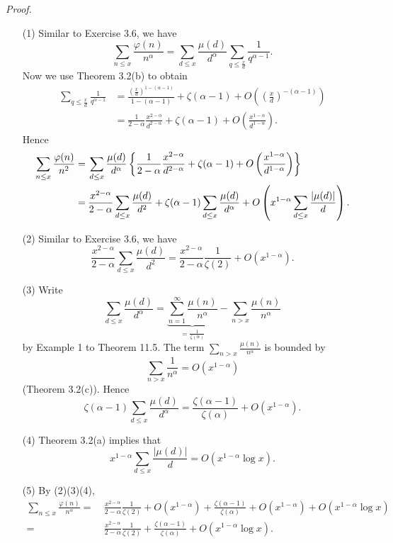 \documentclass{article}
\begin{document}
\emph{Proof.}
\begin{enumerate}
\item[(1)]
  Similar to Exercise 3.6, we have
  \[
    \sum_{n \leq x} \frac{\varphi(n)}{n^\alpha}
    = \sum_{d \leq x} \frac{\mu(d)}{d^\alpha} \sum_{q \leq \frac{x}{d}} \frac{1}{q^{\alpha-1}}.
  \]
  Now we use Theorem 3.2(b) to obtain
  \begin{align*}
    \sum_{q \leq \frac{x}{d}} \frac{1}{q^{\alpha-1}}
    &= \frac{\left( \frac{x}{d} \right)^{1 - (\alpha-1)}}{1 - (\alpha-1)}
        + \zeta(\alpha-1)
        + O\left( \left(\frac{x}{d}\right)^{-(\alpha-1)} \right) \\
    &= \frac{1}{2 - \alpha} \frac{x^{2 - \alpha}}{d^{2 - \alpha}}
        + \zeta(\alpha-1)
        + O\left( \frac{x^{1-\alpha}}{d^{1-\alpha}} \right).
  \end{align*}
  Hence
  \begin{align*}
    \sum_{n \leq x} \frac{\varphi(n)}{n^2}
    =& \: \sum_{d \leq x}
        \frac{\mu(d)}{d^\alpha} \left\{
            \frac{1}{2 - \alpha} \frac{x^{2 - \alpha}}{d^{2 - \alpha}}
            + \zeta(\alpha-1)
            + O\left( \frac{x^{1-\alpha}}{d^{1-\alpha}} \right)
        \right\} \\
    =& \: \frac{x^{2-\alpha}}{2-\alpha} \sum_{d \leq x} \frac{\mu(d)}{d^2}
        + \zeta(\alpha-1) \sum_{d \leq x} \frac{\mu(d)}{d^\alpha}
        + O\left( x^{1-\alpha}
            \sum_{d \leq x} \frac{\abs{\mu(d)}}{d} \right).
  \end{align*}

\item[(2)]
  Similar to Exercise 3.6, we have
  \[
    \frac{x^{2-\alpha}}{2-\alpha} \sum_{d \leq x} \frac{\mu(d)}{d^2}
    = \frac{x^{2-\alpha}}{2-\alpha} \frac{1}{\zeta(2)} + O(x^{1-\alpha}).
  \]

\item[(3)]
  Write
  \[
    \sum_{d \leq x} \frac{\mu(d)}{d^\alpha}
    = \underbrace{\sum_{n=1}^{\infty} \frac{\mu(n)}{n^\alpha}}_{= \frac{1}{\zeta(\alpha)}}
        - \sum_{n > x} \frac{\mu(n)}{n^\alpha}
  \]
  by Example 1 to Theorem 11.5.
  The term $\sum_{n > x} \frac{\mu(n)}{n^\alpha}$
  is bounded by
  \[
    \sum_{n > x} \frac{1}{n^\alpha} = O(x^{1-\alpha})
  \]
  (Theorem 3.2(c)).
  Hence
  \[
    \zeta(\alpha-1) \sum_{d \leq x} \frac{\mu(d)}{d^\alpha}
    = \frac{\zeta(\alpha-1)}{\zeta(\alpha)} + O(x^{1-\alpha}).
  \]

\item[(4)]
  Theorem 3.2(a) implies that
  \[
    x^{1-\alpha} \sum_{d \leq x} \frac{|\mu(d)|}{d} = O(x^{1-\alpha} \log x).
  \]

\item[(5)]
  By (2)(3)(4),
  \begin{align*}
    \sum_{n \leq x} \frac{\varphi(n)}{n^\alpha}
    =& \: \frac{x^{2-\alpha}}{2-\alpha} \frac{1}{\zeta(2)} + O(x^{1-\alpha})
        + \frac{\zeta(\alpha-1)}{\zeta(\alpha)} + O(x^{1-\alpha})
        + O(x^{1-\alpha} \log x) \\
    =& \: \frac{x^{2-\alpha}}{2-\alpha} \frac{1}{\zeta(2)}
        + \frac{\zeta(\alpha-1)}{\zeta(\alpha)} + O(x^{1-\alpha} \log x).
  \end{align*}
\end{enumerate}
\end{document}
